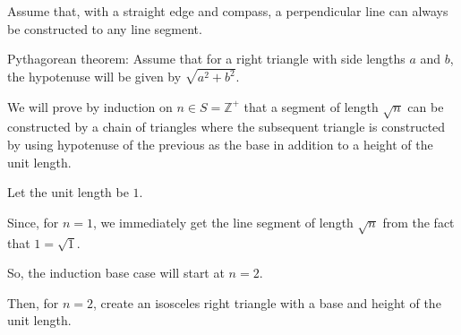 \documentclass{article}
\begin{document}
Assume that, with a straight edge and compass, a perpendicular line can always be constructed to any line segment.

Pythagorean theorem: 
Assume that for a right triangle with side lengths $a$ and $b$, the hypotenuse will be given by $\sqrt{a^2 + b^2}$.

We will prove by induction on $n \in S = \mathbb{Z}^{+}$ that a segment of length $\sqrt{n}$ can be constructed by a chain of triangles 
where the subsequent triangle is constructed by using hypotenuse of the previous as the base in addition to a height of the unit length.

\begin{figure*}[ht]
\centering
{}
\end{figure*}

Let the unit length be $1$.

Since, for $n=1$, we immediately get the line segment of length $\sqrt{n}$ from the fact that $1 = \sqrt{1}$. 

So, the induction base case will start at $n=2$.

Then, for $n=2$, create an isosceles right triangle with a base and height of the unit length.

\begin{figure*}[ht]
\centering
{}
\end{figure*}
\end{document}

